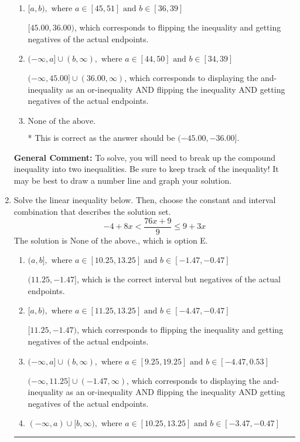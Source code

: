 \documentclass{extbook}[14pt]
\newcommand{\litem}[1]{\item #1

\rule{\textwidth}{0.4pt}}
\begin{document}
\begin{enumerate}
{\begin{enumerate}[label=\Alph*.]
$(-\infty, 45.00) \cup [36.00, \infty)$, which corresponds to displaying the and-inequality as an or-inequality and getting negatives of the actual endpoints.
\item \( [a, b), \text{ where } a \in [45, 51] \text{ and } b \in [36, 39] \)

$[45.00, 36.00)$, which corresponds to flipping the inequality and getting negatives of the actual endpoints.
\item \( (-\infty, a] \cup (b, \infty), \text{ where } a \in [44, 50] \text{ and } b \in [34, 39] \)

$(-\infty, 45.00] \cup (36.00, \infty)$, which corresponds to displaying the and-inequality as an or-inequality AND flipping the inequality AND getting negatives of the actual endpoints.
\item \( \text{None of the above.} \)

* This is correct as the answer should be $(-45.00, -36.00]$.
\end{enumerate}

\textbf{General Comment:} To solve, you will need to break up the compound inequality into two inequalities. Be sure to keep track of the inequality! It may be best to draw a number line and graph your solution.
}
\litem{
Solve the linear inequality below. Then, choose the constant and interval combination that describes the solution set.
\[ -4 + 8 x < \frac{76 x + 9}{9} \leq 9 + 3 x \]The solution is \( \text{None of the above.} \), which is option E.\begin{enumerate}[label=\Alph*.]
\item \( (a, b], \text{ where } a \in [10.25, 13.25] \text{ and } b \in [-1.47, -0.47] \)

$(11.25, -1.47]$, which is the correct interval but negatives of the actual endpoints.
\item \( [a, b), \text{ where } a \in [11.25, 13.25] \text{ and } b \in [-4.47, -0.47] \)

$[11.25, -1.47)$, which corresponds to flipping the inequality and getting negatives of the actual endpoints.
\item \( (-\infty, a] \cup (b, \infty), \text{ where } a \in [9.25, 19.25] \text{ and } b \in [-4.47, 0.53] \)

$(-\infty, 11.25] \cup (-1.47, \infty)$, which corresponds to displaying the and-inequality as an or-inequality AND flipping the inequality AND getting negatives of the actual endpoints.
\item \( (-\infty, a) \cup [b, \infty), \text{ where } a \in [10.25, 13.25] \text{ and } b \in [-3.47, -0.47] \)


\end{enumerate}}
\end{enumerate}
\end{document}
